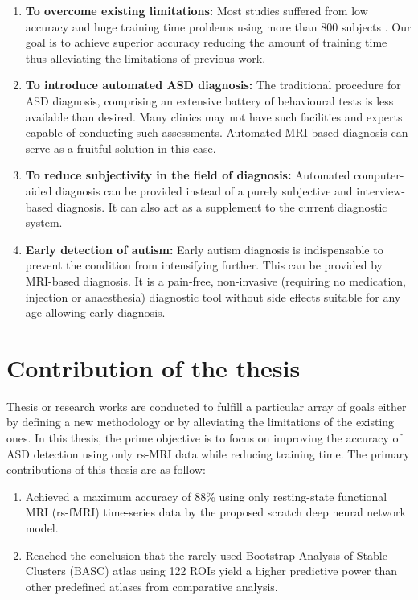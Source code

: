 \begin{enumerate}
    \item \textbf{To overcome existing limitations:} Most studies suffered from low accuracy and
huge training time problems using more than 800 subjects \cite{heinsfeld2018identification}. Our goal is to
achieve superior accuracy reducing the amount of training time thus alleviating
the limitations of previous work.
    \item \textbf{To introduce automated ASD diagnosis:} The traditional procedure for ASD diagnosis,
comprising an extensive battery of behavioural tests is less available than desired.
Many clinics may not have such facilities and experts capable of conducting such
assessments. Automated MRI based diagnosis can serve as a fruitful solution in
this case.
    \item \textbf{To reduce subjectivity in the field of diagnosis:} Automated computer-aided
diagnosis can be provided instead of a purely subjective and interview-based
diagnosis. It can also act as a supplement to the current diagnostic system.
    \item \textbf{Early detection of autism:} Early autism diagnosis is indispensable to prevent the
condition from intensifying further. This can be provided by MRI-based
diagnosis. It is a pain-free, non-invasive (requiring no medication, injection or
anaesthesia) diagnostic tool without side effects suitable for any age allowing
early diagnosis.
\end{enumerate}


\section{Contribution of the thesis}
Thesis or research works are conducted to fulfill a particular array of goals either by defining a new
methodology or by alleviating the limitations of the existing ones. In this thesis, the prime
objective is to focus on improving the accuracy of ASD detection using only rs-MRI data
while reducing training time. The primary contributions of this thesis are as follow:\\

\begin{enumerate}
\item Achieved a maximum accuracy of 88\% using only resting-state functional MRI (rs-fMRI) time-series data by the proposed scratch deep neural network model.
\item Reached the conclusion that the rarely used Bootstrap Analysis of Stable Clusters (\gls{BASC}) atlas using 122 ROIs yield a higher predictive power than other predefined atlases from comparative analysis.
\end{enumerate}


